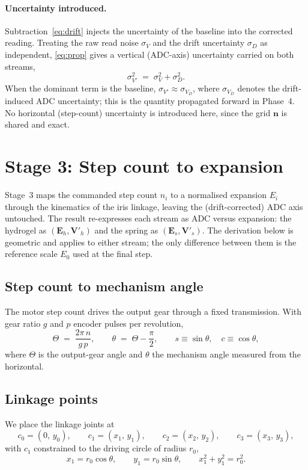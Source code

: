 \documentclass[11pt]{article}
\newcommand{\dset}[1]{\mathbf{#1}}          %
\newcommand{\unc}[1]{\sigma_{#1}}           %
\begin{document}
\paragraph{Uncertainty introduced.}
Subtraction~\eqref{eq:drift} injects the uncertainty of the baseline into the corrected
reading. Treating the raw read noise $\unc{V}$ and the drift uncertainty $\unc{D}$ as
independent, \eqref{eq:prop} gives a vertical (ADC-axis) uncertainty carried on both streams,
\begin{equation}
\unc{V'}^2 \;=\; \unc{V}^2 + \unc{D}^2 .
\label{eq:driftunc}
\end{equation}
When the dominant term is the baseline, $\unc{V'}\!\approx\!\unc{V_D}$, where $\unc{V_D}$
denotes the drift-induced ADC uncertainty; this is the quantity propagated forward in
Phase~4. No horizontal (step-count) uncertainty is introduced here, since the grid $\dset{n}$
is shared and exact.

\section{Stage 3: Step count to expansion}
\label{sec:expansion}
Stage~3 maps the commanded step count $n_i$ to a normalised expansion $E_i$ through the
kinematics of the iris linkage, leaving the (drift-corrected) ADC axis untouched. The result
re-expresses each stream as ADC versus expansion: the hydrogel as $(\dset{E}_h,\dset{V}'_h)$
and the spring as $(\dset{E}_s,\dset{V}'_s)$. The derivation below is geometric and applies
to either stream; the only difference between them is the reference scale $E_0$ used at the
final step.

\subsection{Step count to mechanism angle}
The motor step count drives the output gear through a fixed transmission. With gear ratio $g$
and $p$ encoder pulses per revolution,
\begin{equation}
\Theta \;=\; \frac{2\pi\,n}{g\,p},
\qquad
\theta \;=\; \Theta-\frac{\pi}{2},
\qquad
s\equiv\sin\theta,\quad c\equiv\cos\theta,
\end{equation}
where $\Theta$ is the output-gear angle and $\theta$ the mechanism angle measured from the
horizontal.

\subsection{Linkage points}
We place the linkage joints at
\begin{equation}
c_0=(0,\,y_0),\qquad c_1=(x_1,\,y_1),\qquad c_2=(x_2,\,y_2),\qquad c_3=(x_3,\,y_3),
\end{equation}
with $c_1$ constrained to the driving circle of radius $r_0$,
\begin{equation}
x_1=r_0\cos\theta,\qquad y_1=r_0\sin\theta,\qquad x_1^2+y_1^2=r_0^2 .
\end{equation}
\end{document}
